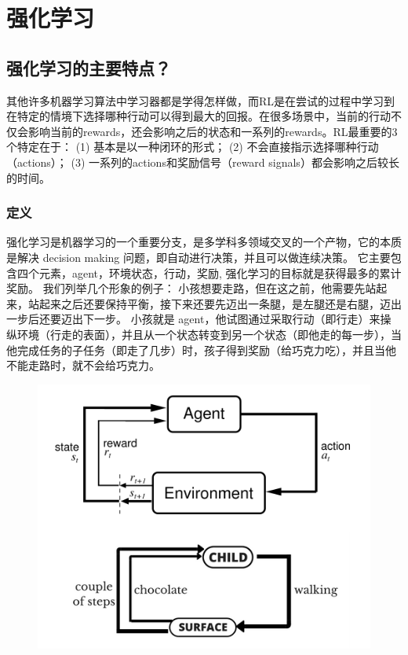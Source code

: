 

\chapter{强化学习}\label{ux7b2cux5341ux7ae0-ux5f3aux5316ux5b66ux4e60}

\section{强化学习的主要特点？}\label{ux5f3aux5316ux5b66ux4e60ux7684ux4e3bux8981ux7279ux70b9}

其他许多机器学习算法中学习器都是学得怎样做，而RL是在尝试的过程中学习到在特定的情境下选择哪种行动可以得到最大的回报。在很多场景中，当前的行动不仅会影响当前的rewards，还会影响之后的状态和一系列的rewards。RL最重要的3个特定在于：
(1) 基本是以一种闭环的形式； (2) 不会直接指示选择哪种行动（actions）；
(3) 一系列的actions和奖励信号（reward signals）都会影响之后较长的时间。

\subsection{  定义}\label{ux5b9aux4e49}

强化学习是机器学习的一个重要分支，是多学科多领域交叉的一个产物，它的本质是解决
decision making 问题，即自动进行决策，并且可以做连续决策。
它主要包含四个元素，agent，环境状态，行动，奖励,
强化学习的目标就是获得最多的累计奖励。 我们列举几个形象的例子：
小孩想要走路，但在这之前，他需要先站起来，站起来之后还要保持平衡，接下来还要先迈出一条腿，是左腿还是右腿，迈出一步后还要迈出下一步。
小孩就是
agent，他试图通过采取行动（即行走）来操纵环境（行走的表面），并且从一个状态转变到另一个状态（即他走的每一步），当他完成任务的子任务（即走了几步）时，孩子得到奖励（给巧克力吃），并且当他不能走路时，就不会给巧克力。

\begin{figure}
\centering
\includegraphics{./img/ch10/10-1.png}
\caption{}
\end{figure}

